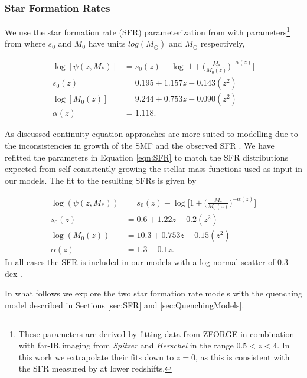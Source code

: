 \subsubsection{Star Formation Rates}
We use the star formation rate (SFR) parameterization from \citet{Lee2015A1.3} with parameters\footnote{These parameters are derived by fitting data from ZFORGE in combination with far-IR imaging from \textit{Spitzer} and \textit{Herschel} in the range $0.5<z<4$. In this work we extrapolate their fits down to $z = 0$, as this is consistent with the SFR measured by  \cite{Salim2007UVUniverse} at lower redshifts.} from \cite{Tomczak2016THE4} where $s_0$ and $M_0$ have units $log(M_{\odot})$ and $M_{\odot}$ respectively,

\begin{equation}
\begin{split}
\label{eqn:SFR}
\log[\psi(z, M_*)] &= s_0(z) - \log \Big[ 1 + \Big(\frac{M_*}{M_0(z)}\Big)^{-\alpha(z)}\Big] \\
s_0(z) &= 0.195 + 1.157z - 0.143(z^2) \\
\log[M_0(z)] &= 9.244 + 0.753z - 0.090(z^2) \\
\alpha(z) &= 1.118.
\end{split}
\end{equation}

As discussed continuity-equation approaches are more suited to modelling due to the inconsistencies in growth of the SMF and the observed SFR \citep{Leja2015ReconcilingFunction}. We have refitted the parameters in Equation \ref{eqn:SFR} to match the SFR distributions expected from self-consistently growing the stellar mass functions used as input in our models. The fit to the resulting SFRs is given by

\begin{equation}
\begin{split}
\label{eqn:SFR_CE}
\log(\psi(z, M_*)) &= s_0(z) - \log \Big[ 1 + \Big(\frac{M_*}{M_0(z)}\Big)^{-\alpha(z)}\Big] \\
s_0(z) &= 0.6 + 1.22z - 0.2(z^2) \\
\log(M_0(z)) &= 10.3 + 0.753z - 0.15(z^2) \\
\alpha(z) &= 1.3 - 0.1z.
\end{split}
\end{equation}
In all cases the SFR is included in our models with a log-normal scatter of 0.3 dex \citep{Leja2015ReconcilingFunction}.


In what follows we explore the two star formation rate models with the quenching model described in Sections \ref{sec:SFR} and \ref{sec:QuenchingModels}. 


